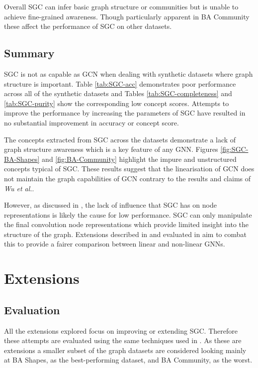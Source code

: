 Overall SGC can infer basic graph structure or communities but is unable to achieve fine-grained awareness.
Though particularly apparent in BA Community these affect the performance of SGC on other datasets.

\subsection{Summary}

SGC is not as capable as GCN when dealing with synthetic datasets where graph structure is important.
Table \ref{tab:SGC-acc} demonstrates poor performance across all of the synthetic datasets and Tables \ref{tab:SGC-completeness} and \ref{tab:SGC-purity} show the corresponding low concept scores.
Attempts to improve the performance by increasing the parameters of SGC have resulted in no substantial improvement in accuracy or concept score.

The concepts extracted from SGC across the datasets demonstrate a lack of graph structure awareness which is a key feature of any GNN.
Figures \ref{fig:SGC-BA-Shapes} and \ref{fig:BA-Community} highlight the impure and unstructured concepts typical of SGC.
These results suggest that the linearisation of GCN does not maintain the graph capabilities of GCN contrary to the results and claims of \textit{Wu et al.}.

However, as discussed in , the lack of influence that SGC has on node representations is likely the cause for low performance.
SGC can only manipulate the final convolution node representations which provide limited insight into the structure of the graph.
Extensions described in  and evaluated in  aim to combat this to provide a fairer comparison between linear and non-linear GNNs.

\section{Extensions}
\label{sec:extension-eval}
\subsection{Evaluation}
All the extensions explored focus on improving or extending SGC.
Therefore these attempts are evaluated using the same techniques used in .
As these are extensions a smaller subset of the graph datasets are considered looking mainly at BA Shapes, as the best-performing dataset, and BA Community, as the worst.

